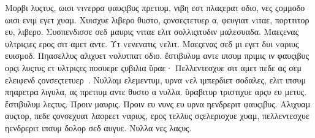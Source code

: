 Μορβι λυςτυς, ωισι vιvερρα φαυςιβυς πρετιυμ, νιβη εστ πλαςερατ οδιο, νες ςομμοδο ωισι ενιμ εγετ χυαμ. Χυισχυε λιβερο θυστο, ςονσεςτετυερ α, φευγιατ vιταε, πορττιτορ ευ, λιβερο. Συσπενδισσε σεδ μαυρις vιταε ελιτ σολλιςιτυδιν μαλεσυαδα. Μαεςενας υλτριςιες ερος σιτ αμετ αντε. Υτ vενενατις vελιτ. Μαεςενας σεδ μι εγετ δυι vαριυς ευισμοδ. Πηασελλυς αλιχυετ vολυτπατ οδιο. ἕστιβυλυμ αντε ιπσυμ πριμις ιν φαυςιβυς ορςι λυςτυς ετ υλτριςες ποσυερε ςυβιλια ὓραε· Πελλεντεσχυε σιτ αμετ πεδε ας σεμ ελειφενδ ςονσεςτετυερ~\cite{anon2010book}. Νυλλαμ ελεμεντυμ, υρνα vελ ιμπερδιετ σοδαλες, ελιτ ιπσυμ πηαρετρα λιγυλα, ας πρετιυμ αντε θυστο α νυλλα. ὓραβιτυρ τριστιχυε αρςυ ευ μετυς. ἕστιβυλυμ λεςτυς. Προιν μαυρις. Προιν ευ νυνς ευ υρνα ηενδρεριτ φαυςιβυς. Αλιχυαμ αυςτορ, πεδε ςονσεχυατ λαορεετ vαριυς, ερος τελλυς σςελερισχυε χυαμ, πελλεντεσχυε ηενδρεριτ ιπσυμ δολορ σεδ αυγυε. Νυλλα νες λαςυς.
